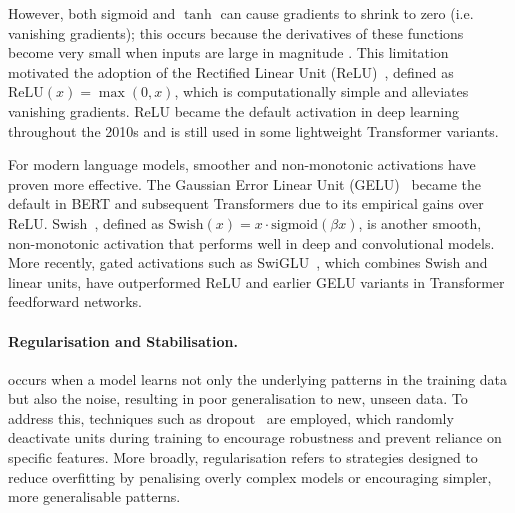 However, both sigmoid and $\tanh$ can cause gradients to shrink to zero (i.e. vanishing gradients); this occurs because the derivatives of these functions become very small when inputs are large in magnitude \citep{glorot2010understanding}. This limitation motivated the adoption of the Rectified Linear Unit (ReLU)~\citep{nair2010rectified}, defined as $\mathrm{ReLU}(x) = \max(0, x)$, which is computationally simple and alleviates vanishing gradients. ReLU became the default activation in deep learning throughout the 2010s and is still used in some lightweight Transformer variants. %

For modern language models, smoother and non-monotonic activations have proven more effective. The Gaussian Error Linear Unit (GELU)~\citep{hendrycks2016gaussian} became the default in BERT and subsequent Transformers due to its empirical gains over ReLU. Swish~\citep{ramachandran2017searching}, defined as $\mathrm{Swish}(x) = x \cdot \mathrm{sigmoid}(\beta x)$, is another smooth, non-monotonic activation that performs well in deep and convolutional models. More recently, gated activations such as SwiGLU~\citep{shazeer2020glu}, which combines Swish and linear units, have outperformed ReLU and earlier GELU variants in Transformer feedforward networks.

\paragraph{Regularisation and Stabilisation.}  occurs when a model learns not only the underlying patterns in the training data but also the noise, resulting in poor generalisation to new, unseen data. To address this,  techniques such as dropout~\citep{srivastava2014dropout} are employed, which randomly deactivate units during training to encourage robustness and prevent reliance on specific features. More broadly, regularisation refers to strategies designed to reduce overfitting by penalising overly complex models or encouraging simpler, more generalisable patterns.

